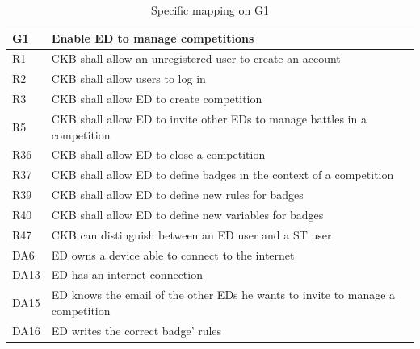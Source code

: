   \begin{table}[H]
    \begin{tabular}{|l|p{12cm}| }
      \hline
      \textbf{G1} & \textbf{Enable ED to manage competitions}      \\
      \hline
      R1 & CKB shall allow an unregistered user to create an account \\
      \hline
      R2 & CKB shall allow users to log in \\
      \hline
      R3 & CKB shall allow ED to create competition \\
      \hline
      R5 & CKB shall allow ED to invite other EDs to manage battles in a competition \\
      \hline
      R36 & CKB shall allow ED to close a competition \\
      \hline
      R37 & CKB shall allow ED to define badges in the context of a competition \\
      \hline
      R39 & CKB shall allow ED to define new rules for badges \\
      \hline
      R40 & CKB shall allow ED to define new variables for badges \\
      \hline
      R47 & CKB can distinguish between an ED user and a ST user \\
      \hline
      DA6 & ED owns a device able to connect to the internet \\
      \hline
      DA13 & ED has an internet connection \\
      \hline
      DA15 & ED knows the email of the other EDs he wants to invite to manage a competition \\
      \hline
      DA16 & ED writes the correct badge’ rules \\
      \hline
    \end{tabular}
    \caption{Specific mapping on G1}
    \label{tab:mappingG1}
  \end{table}

